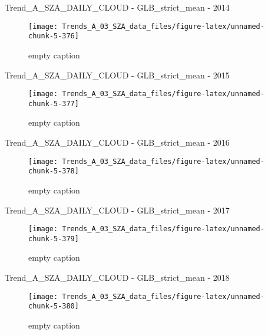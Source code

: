 \documentclass[
  10pt,
  a4paper,oneside]{article}
\begin{document}
Trend\_A\_SZA\_DAILY\_CLOUD - GLB\_strict\_mean - 2014

\begin{figure}[!ht]

{\centering \texttt{[image: Trends\_A\_03\_SZA\_data\_files/figure-latex/unnamed-chunk-5-376]} 

}

\caption{ empty caption }\label{fig:unnamed-chunk-5-376}
\end{figure}

Trend\_A\_SZA\_DAILY\_CLOUD - GLB\_strict\_mean - 2015

\begin{figure}[!ht]

{\centering \texttt{[image: Trends\_A\_03\_SZA\_data\_files/figure-latex/unnamed-chunk-5-377]} 

}

\caption{ empty caption }\label{fig:unnamed-chunk-5-377}
\end{figure}

Trend\_A\_SZA\_DAILY\_CLOUD - GLB\_strict\_mean - 2016

\begin{figure}[!ht]

{\centering \texttt{[image: Trends\_A\_03\_SZA\_data\_files/figure-latex/unnamed-chunk-5-378]} 

}

\caption{ empty caption }\label{fig:unnamed-chunk-5-378}
\end{figure}

Trend\_A\_SZA\_DAILY\_CLOUD - GLB\_strict\_mean - 2017

\begin{figure}[!ht]

{\centering \texttt{[image: Trends\_A\_03\_SZA\_data\_files/figure-latex/unnamed-chunk-5-379]} 

}

\caption{ empty caption }\label{fig:unnamed-chunk-5-379}
\end{figure}

Trend\_A\_SZA\_DAILY\_CLOUD - GLB\_strict\_mean - 2018

\begin{figure}[!ht]

{\centering \texttt{[image: Trends\_A\_03\_SZA\_data\_files/figure-latex/unnamed-chunk-5-380]} 

}

\caption{ empty caption }\label{fig:unnamed-chunk-5-380}
\end{figure}
\end{document}

